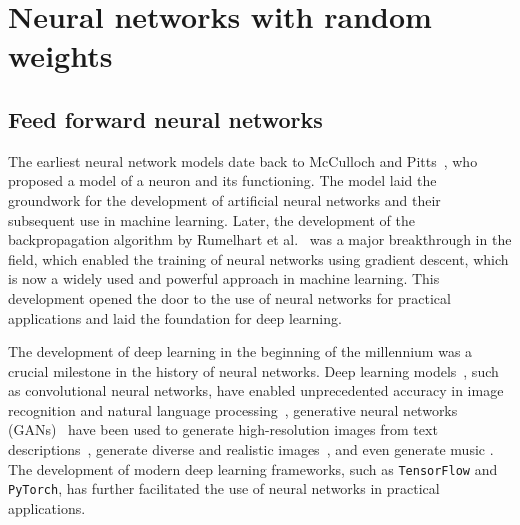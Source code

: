 
\section{Neural networks with random weights}

\subsection{Feed forward neural networks}\label{sec:NN}
The earliest neural network models date back to McCulloch and Pitts~\cite{McCulloch1943AActivity}, who proposed a model of a neuron and its functioning. The model laid the groundwork for the development of artificial neural networks and their subsequent use in machine learning. Later, the development of the backpropagation algorithm by Rumelhart et al.~\cite{Rumelhart1986LearningErrors} was a major breakthrough in the field, which enabled the training of neural networks using gradient descent, which is now a widely used and powerful approach in machine learning. This development opened the door to the use of neural networks for practical applications and laid the foundation for deep learning. 

The development of deep learning in the beginning of the millennium was a crucial milestone in the history of neural networks. Deep learning models~\cite{Goodfellow2016DeepLearning}, such as convolutional neural networks, have enabled unprecedented accuracy in image recognition and natural language processing~\cite{Gu2018RecentNetworks}, generative neural networks (GANs)~\cite{Goodfellow2020GenerativeNetworks} have been used to generate high-resolution images from text descriptions~\cite{Radford2015UnsupervisedNetworks}, generate diverse and realistic images~\cite{Karras2018ANetworks}, and even generate music \cite{Engel2019GANSynth:Synthesis}. The development of modern deep learning frameworks, such as \texttt{TensorFlow} and \texttt{PyTorch}, has further facilitated the use of neural networks in practical applications. 

